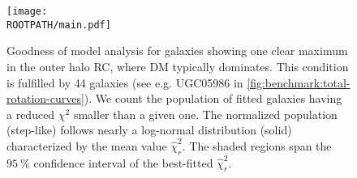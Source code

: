 \begin{figure}%
	\centering%
	\texttt{[image: \\ROOTPATH/main.pdf]}%
	\caption{Goodness of model analysis for galaxies showing one clear maximum in the outer halo RC, where DM typically dominates. This condition is fulfilled by 44 galaxies (see e.g. UGC05986 in \cref{fig:benchmark:total-rotation-curves}). We count the population of fitted galaxies having a reduced $\chi^2$ smaller than a given one. The normalized population (step-like) follows nearly a log-normal distribution (solid) characterized by the mean value $\hat \chi^2_r$. The shaded regions span the $\SI{95}{\percent}$ confidence interval of the best-fitted $\hat \chi^2_r$.}%
	\label{fig:goodness:with-cutoff}
\end{figure}